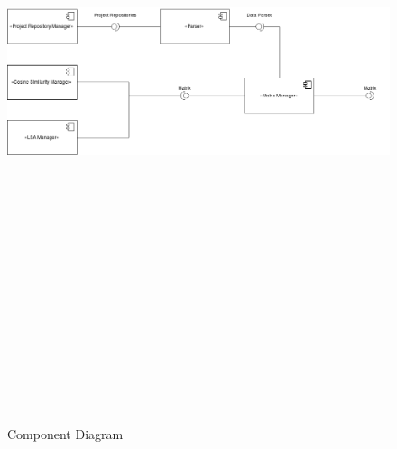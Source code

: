 
\begin{figure}[!h]
	\includegraphics[width=15cm,height=20cm,keepaspectratio]{images/ComponentDiagram.png}
	\caption{Component Diagram}
	\label{fig:Components}
\end{figure}



